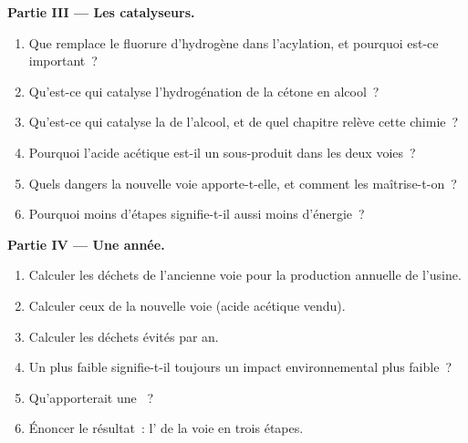 \begin{problem}
\medskip\noindent\textbf{Partie III --- Les catalyseurs.}
\begin{enumerate}[resume]
  \item Que remplace le fluorure d'hydrogène dans l'acylation, et pourquoi
        est-ce important~?
  \item Qu'est-ce qui catalyse l'hydrogénation de la cétone en alcool~?
  \item Qu'est-ce qui catalyse la  de l'alcool, et de quel
        chapitre relève cette chimie~?
  \item Pourquoi l'acide acétique est-il un sous-produit dans les deux
        voies~?
  \item Quels dangers la nouvelle voie apporte-t-elle, et comment les
        maîtrise-t-on~?
  \item Pourquoi moins d'étapes signifie-t-il aussi moins d'énergie~?
\end{enumerate}

\medskip\noindent\textbf{Partie IV --- Une année.}
\begin{enumerate}[resume]
  \item Calculer les déchets de l'ancienne voie pour la production annuelle
        de l'usine.
  \item Calculer ceux de la nouvelle voie (acide acétique vendu).
  \item Calculer les déchets évités par an.
  \item Un  plus faible signifie-t-il toujours un impact
        environnemental plus faible~?
  \item Qu'apporterait une ~?
  \item Énoncer le résultat~: l' de la voie en trois
        étapes.
\end{enumerate}
\end{problem}
